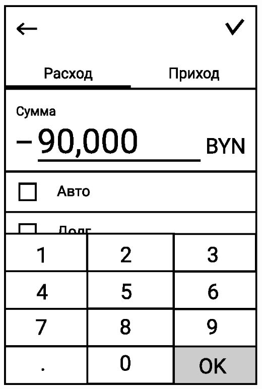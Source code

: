 \documentclass[russian,utf8,a1paper,nostitching,simple]{eskdgraph}
\begin{document}
\begin{ESKDdrawing}
\begin{minipage}{17cm}
\begin{minipage}{7.5cm}
      \vspace{1cm}
      \centering
      \includegraphics[width=\linewidth]{fig/ui_activities_input_outcome_text.eps}


\end{minipage}
\end{minipage}
\end{ESKDdrawing}
\end{document}
